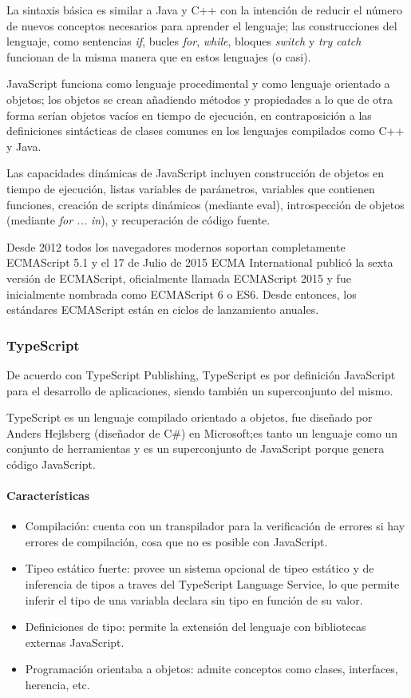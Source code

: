 La sintaxis básica es similar a Java y C++ con la intención de reducir el número de nuevos conceptos necesarios para aprender el lenguaje; las construcciones del lenguaje, como sentencias \textit{if}, bucles \textit{for}, \textit{while}, bloques \textit{switch} y \textit{try catch} funcionan de la misma manera que en estos lenguajes (o casi).


JavaScript funciona como lenguaje procedimental y como lenguaje orientado a objetos; los objetos se crean añadiendo métodos y propiedades a lo que de otra forma serían objetos vacíos en tiempo de ejecución, en contraposición a las definiciones sintácticas de clases comunes en los lenguajes compilados como C++ y Java.


Las capacidades dinámicas de JavaScript incluyen construcción de objetos en tiempo de ejecución, listas variables de parámetros, variables que contienen funciones, creación de scripts dinámicos (mediante eval), introspección de objetos (mediante \textit{for ... in}), y recuperación de código fuente.


Desde 2012 todos los navegadores modernos soportan completamente ECMAScript 5.1 y el 17 de Julio de 2015 ECMA International publicó la sexta versión de ECMAScript, oficialmente llamada ECMAScript 2015 y fue inicialmente nombrada como ECMAScript 6 o ES6. Desde entonces, los estándares ECMAScript están en ciclos de lanzamiento anuales.


\subsubsection*{TypeScript}
De acuerdo con TypeScript Publishing\cite{publishing_typescript_2019}, TypeScript es por definición JavaScript para el desarrollo de aplicaciones, siendo también un superconjunto del mismo.


TypeScript es un lenguaje compilado orientado a objetos, fue diseñado por Anders Hejlsberg (diseñador de C\#) en Microsoft;es tanto un lenguaje como un conjunto de herramientas y es un superconjunto de JavaScript porque genera código JavaScript.


\paragraph*{Características}
\begin{itemize}
    \item Compilación: cuenta con un transpilador para la verificación de errores si hay errores de compilación, cosa que no es posible con JavaScript.
    \item Tipeo estático fuerte: provee un sistema opcional de tipeo estático y de inferencia de tipos a traves del TypeScript Language Service, lo que permite inferir el tipo de una variabla declara sin tipo en función de su valor.
    \item Definiciones de tipo: permite la extensión del lenguaje con bibliotecas externas JavaScript.
    \item Programación orientaba a objetos: admite conceptos como clases, interfaces, herencia, etc.
\end{itemize}



